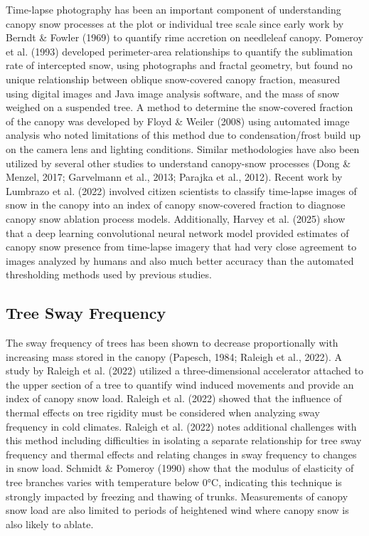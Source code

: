 \documentclass[
  letterpaper,
]{tex/uofsthesis-cs}
\begin{document}
Time-lapse photography has been an important component of understanding
canopy snow processes at the plot or individual tree scale since early
work by Berndt \& Fowler (1969) to quantify rime accretion on needleleaf
canopy. Pomeroy et al. (1993) developed perimeter-area relationships to
quantify the sublimation rate of intercepted snow, using photographs and
fractal geometry, but found no unique relationship between oblique
snow-covered canopy fraction, measured using digital images and Java
image analysis software, and the mass of snow weighed on a suspended
tree. A method to determine the snow-covered fraction of the canopy was
developed by Floyd \& Weiler (2008) using automated image analysis who
noted limitations of this method due to condensation/frost build up on
the camera lens and lighting conditions. Similar methodologies have also
been utilized by several other studies to understand canopy-snow
processes (Dong \& Menzel, 2017; Garvelmann et al., 2013; Parajka et
al., 2012). Recent work by Lumbrazo et al. (2022) involved citizen
scientists to classify time-lapse images of snow in the canopy into an
index of canopy snow-covered fraction to diagnose canopy snow ablation
process models. Additionally, Harvey et al. (2025) show that a deep
learning convolutional neural network model provided estimates of canopy
snow presence from time-lapse imagery that had very close agreement to
images analyzed by humans and also much better accuracy than the
automated thresholding methods used by previous studies.

\subsection{Tree Sway Frequency}\label{tree-sway-frequency}

The sway frequency of trees has been shown to decrease proportionally
with increasing mass stored in the canopy (Papesch, 1984; Raleigh et
al., 2022). A study by Raleigh et al. (2022) utilized a
three-dimensional accelerator attached to the upper section of a tree to
quantify wind induced movements and provide an index of canopy snow
load. Raleigh et al. (2022) showed that the influence of thermal effects
on tree rigidity must be considered when analyzing sway frequency in
cold climates. Raleigh et al. (2022) notes additional challenges with
this method including difficulties in isolating a separate relationship
for tree sway frequency and thermal effects and relating changes in sway
frequency to changes in snow load. Schmidt \& Pomeroy (1990) show that
the modulus of elasticity of tree branches varies with temperature below
0°C, indicating this technique is strongly impacted by freezing and
thawing of trunks. Measurements of canopy snow load are also limited to
periods of heightened wind where canopy snow is also likely to ablate.
\end{document}
